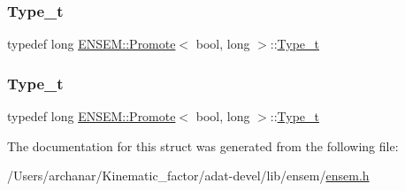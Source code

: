 \subsubsection{\texorpdfstring{Type\_t}{Type\_t}\hspace{0.1cm}{\footnotesize\ttfamily [2/3]}}
{\footnotesize\ttfamily typedef long \mbox{\hyperlink{structENSEM_1_1Promote}{E\+N\+S\+E\+M\+::\+Promote}}$<$ bool, long $>$\+::\mbox{\hyperlink{structENSEM_1_1Promote_3_01bool_00_01long_01_4_a92d4af8adfcc1f69cde4f02b85f783c9}{Type\+\_\+t}}}

\mbox{\label{structENSEM_1_1Promote_3_01bool_00_01long_01_4_a92d4af8adfcc1f69cde4f02b85f783c9}} 
\subsubsection{\texorpdfstring{Type\_t}{Type\_t}\hspace{0.1cm}{\footnotesize\ttfamily [3/3]}}
{\footnotesize\ttfamily typedef long \mbox{\hyperlink{structENSEM_1_1Promote}{E\+N\+S\+E\+M\+::\+Promote}}$<$ bool, long $>$\+::\mbox{\hyperlink{structENSEM_1_1Promote_3_01bool_00_01long_01_4_a92d4af8adfcc1f69cde4f02b85f783c9}{Type\+\_\+t}}}



The documentation for this struct was generated from the following file\+:\begin{DoxyCompactItemize}
\item 
/\+Users/archanar/\+Kinematic\+\_\+factor/adat-\/devel/lib/ensem/\mbox{\hyperlink{adat-devel_2lib_2ensem_2ensem_8h}{ensem.\+h}}\end{DoxyCompactItemize}
